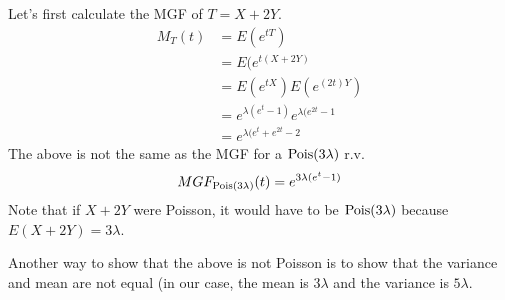 \documentclass[11pt]{article}
\begin{document}
\begin{solution}
Let's first calculate the MGF of $T = X + 2Y$.
\begin{align*}
M_T(t) &= E(e^{tT}) \\
&= E(e^{t(X + 2Y)} \\
&= E(e^{tX})E(e^{(2t)Y}) \\
&= e^{\lambda(e^t - 1)}e^{\lambda(e^{2t} - 1} \\
&= e^{\lambda(e^t + e^{2t} - 2}
\end{align*}
The above is not the same as the MGF for a $\textrm{Pois}(3\lambda)$ r.v.
$$
MGF_{\textrm{Pois}(3\lambda)}(t) = e^{3\lambda(e^{t} - 1)}
$$
Note that if $X + 2Y$ were Poisson, it would have to be $\textrm{Pois}(3\lambda)$ because $E(X + 2Y) = 3\lambda$.

Another way to show that the above is not Poisson is to show that the variance and mean are not equal (in our case, the mean is $3\lambda$ and the variance is $5\lambda$.
\end{solution}
\end{document}
